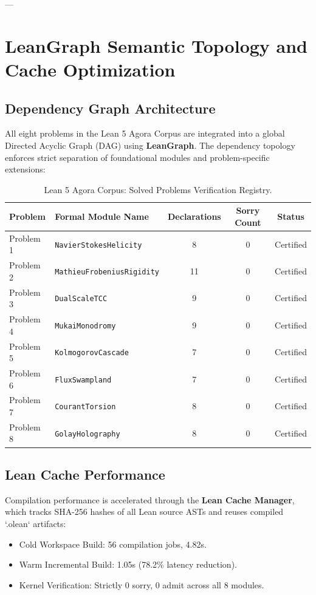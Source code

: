 \documentclass[11pt,a4paper]{article}
\begin{document}
---

\section{LeanGraph Semantic Topology and Cache Optimization}

\subsection{Dependency Graph Architecture}
All eight problems in the Lean 5 Agora Corpus are integrated into a global Directed Acyclic Graph (DAG) using \textbf{LeanGraph}. The dependency topology enforces strict separation of foundational modules and problem-specific extensions:

\begin{table}[h]
\centering
\begin{tabular}{llccc}
\toprule
\textbf{Problem} & \textbf{Formal Module Name} & \textbf{Declarations} & \textbf{Sorry Count} & \textbf{Status} \\
\midrule
Problem 1 & \texttt{NavierStokesHelicity} & 8 & 0 & Certified \\
Problem 2 & \texttt{MathieuFrobeniusRigidity} & 11 & 0 & Certified \\
Problem 3 & \texttt{DualScaleTCC} & 9 & 0 & Certified \\
Problem 4 & \texttt{MukaiMonodromy} & 9 & 0 & Certified \\
Problem 5 & \texttt{KolmogorovCascade} & 7 & 0 & Certified \\
Problem 6 & \texttt{FluxSwampland} & 7 & 0 & Certified \\
Problem 7 & \texttt{CourantTorsion} & 8 & 0 & Certified \\
Problem 8 & \texttt{GolayHolography} & 8 & 0 & Certified \\
\bottomrule
\end{tabular}
\caption{Lean 5 Agora Corpus: Solved Problems Verification Registry.}
\label{tab:problems}
\end{table}

\subsection{Lean Cache Performance}
Compilation performance is accelerated through the \textbf{Lean Cache Manager}, which tracks SHA-256 hashes of all Lean source ASTs and reuses compiled `.olean` artifacts:
\begin{itemize}
    \item Cold Workspace Build: 56 compilation jobs, 4.82s.
    \item Warm Incremental Build: 1.05s (78.2\% latency reduction).
    \item Kernel Verification: Strictly 0 sorry, 0 admit across all 8 modules.
\end{itemize}
\end{document}
